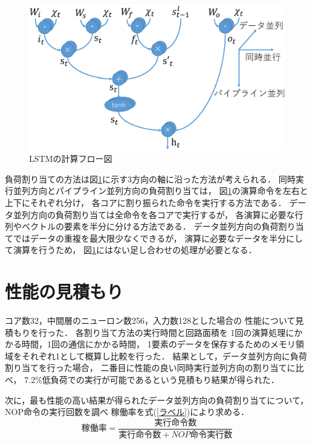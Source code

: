 \documentclass[a4j]{jarticle}
\begin{document}
\begin{Abstract}
 \begin{figure}[h]
  \centering
  \includegraphics[scale=0.25]{flow.eps}
  \caption{LSTMの計算フロー図}
  \label{フロー図}
 \end{figure}
負荷割り当ての方法は図\ref{フロー図}に示す3方向の軸に沿った方法が考えられる．
同時実行並列方向とパイプライン並列方向の負荷割り当ては，
図\ref{フロー図}の演算命令を左右と上下にそれぞれ分け，
各コアに割り振られた命令を実行する方法である．
データ並列方向の負荷割り当ては全命令を各コアで実行するが，
各演算に必要な行列やベクトルの要素を半分に分ける方法である．
データ並列方向の負荷割り当てではデータの重複を最大限少なくできるが，
演算に必要なデータを半分にして演算を行うため，
図\ref{フロー図}にはない足し合わせの処理が必要となる．


 \section{性能の見積もり}
 コア数32，中間層のニューロン数256，入力数128とした場合の
 性能について見積もりを行った．
 各割り当て方法の実行時間と回路面積を
 1回の演算処理にかかる時間，1回の通信にかかる時間，
 1要素のデータを保存するためのメモリ領域をそれぞれ1として概算し比較を行った．
 結果として，データ並列方向に負荷割り当てを行った場合，
 二番目に性能の良い同時実行並列方向の割り当てに比べ，
 7.2\%低負荷での実行が可能であるという見積もり結果が得られた．

次に，最も性能の高い結果が得られたデータ並列方向の負荷割り当てについて，
NOP命令の実行回数を調べ
稼働率を式(\ref{ラベル})により求める．
\begin{equation}
  稼働率 = \frac{実行命令数}{実行命令数+NOP命令実行数}
  \label{ラベル}
\end{equation}


\end{Abstract}
\end{document}
